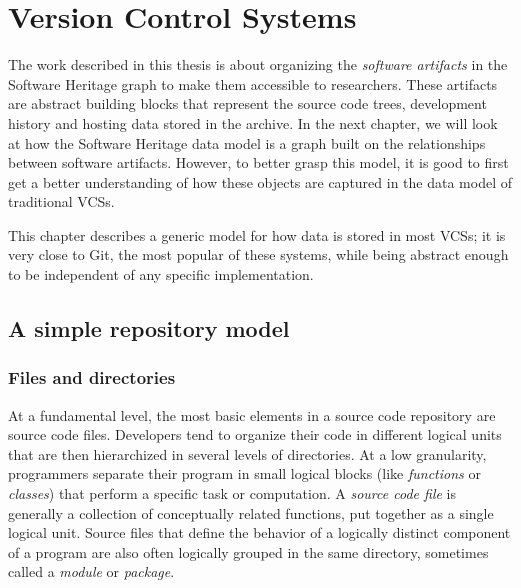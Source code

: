 \chapter{Version Control Systems}%
\label{chp:version-control-systems}

The work described in this thesis is about organizing the \emph{software
artifacts} in the Software Heritage graph to make them accessible to
researchers. These artifacts are abstract building blocks that represent the
source code trees, development history and hosting data stored in the archive.
In the next chapter, we will look at how the Software Heritage data model is a
graph built on the relationships between software artifacts. However, to better
grasp this model, it is good to first get a better understanding of how
these objects are captured in the data model of traditional \glspl{VCS}.

This chapter describes a generic model for how data is stored in most
\glspl{VCS}; it is very close to Git, the most popular of these systems, while
being abstract enough to be independent of any specific implementation.

\section{A simple repository model}

\subsection{Files and directories}

At a fundamental level, the most basic elements in a source code repository are
source code files. Developers tend to organize their code in different logical
units that are then hierarchized in several levels of directories. At a low
granularity, programmers separate their program in small logical blocks (like
\emph{functions} or \emph{classes}) that perform a specific task or
computation. A \emph{source code file} is generally a collection of
conceptually related functions, put together as a single logical unit. Source
files that define the behavior of a logically distinct component of a program
are also often logically grouped in the same directory, sometimes called a
\emph{module} or \emph{package}.

